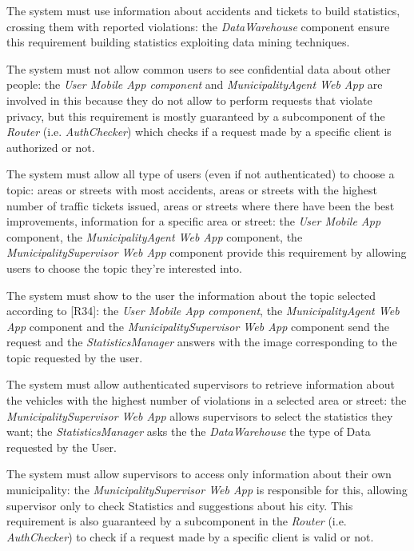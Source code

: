 \documentclass[a4paper]{report}
\begin{document}
\begin{enumerate}[start=1,label={[R\arabic*]}]
\item \label{[R32]}The system must use information  about accidents and tickets to build statistics, crossing them with reported violations: the \textit{DataWarehouse} component ensure this requirement building statistics exploiting data mining techniques.
\item \label{[R33]}The system must not allow common users to see confidential data about other people: the \textit{User Mobile App component} and \textit{MunicipalityAgent Web App} are involved in this because they do not allow to perform requests that violate privacy, but this requirement is mostly guaranteed by a subcomponent of the \textit{Router} (i.e. \textit{AuthChecker}) which checks if a request made by a specific client is authorized or not.
\item \label{[R34]}The system must allow all type of users (even if not authenticated) to choose a topic: areas or streets with most accidents, areas or streets with the highest number of traffic tickets issued, areas or streets where there have been the best improvements, information for a specific area or street: the \textit{User Mobile App} component, the  \textit{MunicipalityAgent Web App} component, the \textit{MunicipalitySupervisor Web App} component provide this requirement by allowing users to choose the topic they're interested into.
\item \label{[R35]}The system must show to the user the information about the topic selected according to [R34]: the \textit{User Mobile App component}, the \textit{MunicipalityAgent Web App} component and the \textit{MunicipalitySupervisor Web App} component send the request and the \textit{StatisticsManager} answers with the image corresponding to the topic requested by the user.
\item \label{[R36]}The system must allow authenticated supervisors to retrieve information about the vehicles with the highest number of violations in a selected area or street: the \textit{MunicipalitySupervisor Web App} allows supervisors to select the statistics they want; the \textit{StatisticsManager} asks the the \textit{DataWarehouse} the type of Data requested by the User.
\item \label{[R37]}The system must allow supervisors to access only information about their own municipality: the \textit{MunicipalitySupervisor Web App} is responsible for this, allowing supervisor only to check Statistics and suggestions about his city. This requirement is also guaranteed by a subcomponent in the \textit{Router} (i.e. \textit{AuthChecker}) to check if a request made by a specific client is valid or not.

\end{enumerate}
\end{document}
